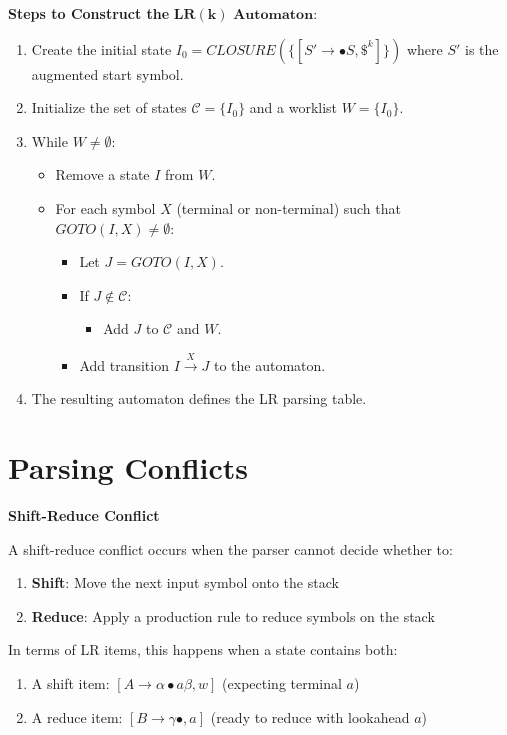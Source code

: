 \textbf{Steps to Construct the} $\mathbf{LR(k) \text{ Automaton}}$:
\begin{enumerate}
\item Create the initial state $I_0 = CLOSURE(\{[S' \to \bullet S, \$^k]\})$ where $S'$ is the augmented start symbol.
\item Initialize the set of states $\mathcal{C} = \{I_0\}$ and a worklist $W = \{I_0\}$.
\item While $W \neq \emptyset$:
   \begin{itemize}
   \item Remove a state $I$ from $W$.
   \item For each symbol $X$ (terminal or non-terminal) such that $GOTO(I, X) \neq \emptyset$:
     \begin{itemize}
     \item Let $J = GOTO(I, X)$.
     \item If $J \notin \mathcal{C}$:
       \begin{itemize}
       \item Add $J$ to $\mathcal{C}$ and $W$.
       \end{itemize}
     \item Add transition $I \xrightarrow{X} J$ to the automaton.
     \end{itemize}
   \end{itemize}
\item The resulting automaton defines the LR parsing table.
\end{enumerate}




\section{Parsing Conflicts}

\textbf{Shift-Reduce Conflict}

A shift-reduce conflict occurs when the parser cannot decide whether to:
\begin{enumerate}
\item \textbf{Shift}: Move the next input symbol onto the stack
\item \textbf{Reduce}: Apply a production rule to reduce symbols on the stack
\end{enumerate}

In terms of LR items, this happens when a state contains both:
\begin{enumerate}
\item A shift item: $[A \to \alpha \bullet a \beta, w]$ (expecting terminal $a$)
\item A reduce item: $[B \to \gamma \bullet, a]$ (ready to reduce with lookahead $a$)
\end{enumerate}

